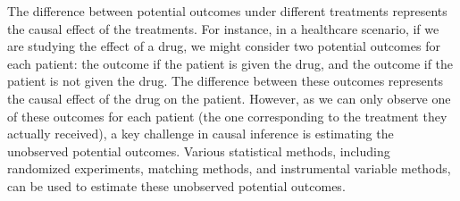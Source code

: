 The difference between potential outcomes under different treatments represents the causal effect of the treatments. For instance, in a healthcare scenario, if we are studying the effect of a drug, we might consider two potential outcomes for each patient: the outcome if the patient is given the drug, and the outcome if the patient is not given the drug. The difference between these outcomes represents the causal effect of the drug on the patient. However, as we can only observe one of these outcomes for each patient (the one corresponding to the treatment they actually received), a key challenge in causal inference is estimating the unobserved potential outcomes. Various statistical methods, including randomized experiments, matching methods, and instrumental variable methods, can be used to estimate these unobserved potential outcomes.

